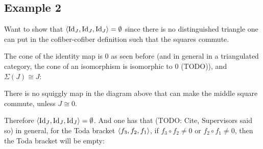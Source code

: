 \subsection{Example 2}

Want to show that \( \langle \operatorname{Id}_J, \operatorname{Id}_J, \operatorname{Id}_J \rangle = \emptyset \) since there is no distinguished triangle one can put in the cofiber-cofiber definition such that the squares commute.

The cone of the identity map is \( 0 \) as seen before (and in general in a triangulated category, the cone of an isomorphism is isomorphic to \( 0 \) (TODO)), and \( \Sigma(J) \cong J \):

\begin{center}
\end{center}

There is no squiggly map in the diagram above that can make the middle square commute, unless \( J \cong 0 \).

Therefore \( \langle \operatorname{Id}_J, \operatorname{Id}_J, \operatorname{Id}_J \rangle = \emptyset \). And one has that (TODO: Cite, Supervisors said so) in general, for the Toda bracket \( \langle f_3, f_2, f_1 \rangle \), if \( f_3 \circ f_2 \neq 0 \) or \( f_2 \circ f_1 \neq 0 \), then the Toda bracket will be empty:

